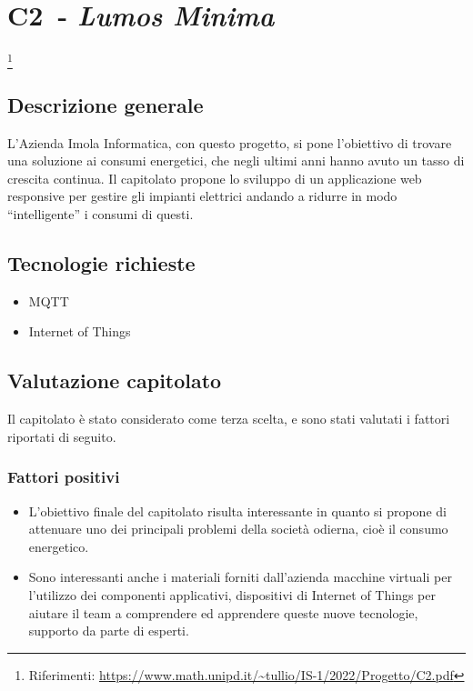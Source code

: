 
\renewcommand{\capName}{\textit{Lumos Minima}} %
\renewcommand{\capCode}{C2} %
\renewcommand{\capLink}{https://www.math.unipd.it/~tullio/IS-1/2022/Progetto/C2.pdf} %
\renewcommand{\capProposer}{ImolaInformatica} %


\section{\capCode\ - \capName} \footnote{Riferimenti: \url{\capLink}}
\subsection{Descrizione generale}
L'Azienda Imola Informatica, con questo progetto, si pone l'obiettivo di trovare una soluzione ai consumi energetici, che negli ultimi anni hanno avuto un tasso di crescita continua. Il capitolato propone lo sviluppo di un applicazione web responsive per gestire gli impianti elettrici andando a ridurre in modo “intelligente” i consumi di questi.
\subsection{Tecnologie richieste}
\begin{itemize}
    \item MQTT
    \item Internet of Things
\end{itemize}

\subsection{Valutazione capitolato}
Il capitolato è stato considerato come terza scelta, e sono stati valutati i fattori riportati di seguito.

\subsubsection{Fattori positivi}

\begin{itemize}
    \item L'obiettivo finale del capitolato risulta interessante in quanto si propone di attenuare uno dei principali problemi della società odierna, cioè il consumo energetico.
    \item Sono interessanti anche i materiali forniti dall'azienda macchine virtuali per l'utilizzo dei componenti applicativi, dispositivi di Internet of Things per aiutare il team a comprendere ed apprendere queste nuove tecnologie, supporto da parte di esperti.
\end{itemize}

